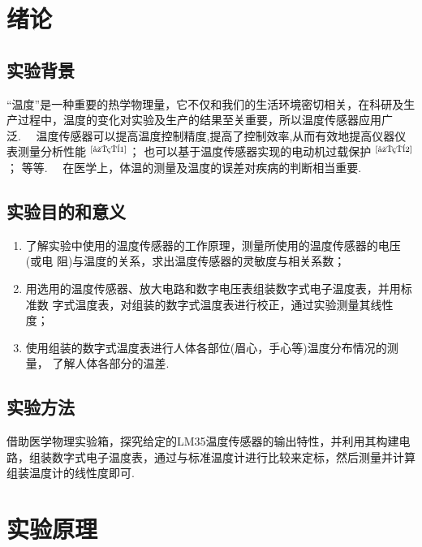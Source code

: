 \documentclass[a4paper,12pt]{article}%
\begin{document}
\section{绪论}%
\subsection{实验背景}
\begin{spacing}{1.528}%
“温度”是一种重要的热学物理量，它不仅和我们的生活环境密切相关，在科研及生产过程中，温度的变化对实验及生产的结果至关重要，所以温度传感器应用广泛.~~
温度传感器可以提高温度控制精度,提高了控制效率,从而有效地提高仪器仪表测量分析性能
$^\text{\cite{应用1}}$；
也可以基于温度传感器实现的电动机过载保护
$^\text{\cite{应用2}}$；
等等.~~
在医学上，体温的测量及温度的误差对疾病的判断相当重要.~~
\end{spacing}

\subsection{实验目的和意义}
\begin{spacing}{1.528}%
    \begin{enumerate}
        \item 了解实验中使用的温度传感器的工作原理，测量所使用的温度传感器的电压(或电 阻)与温度的关系，求出温度传感器的灵敏度与相关系数；
        \item 用选用的温度传感器、放大电路和数字电压表组装数字式电子温度表，并用标准数 字式温度表，对组装的数字式温度表进行校正，通过实验测量其线性度；
        \item 使用组装的数字式温度表进行人体各部位(眉心，手心等)温度分布情况的测量， 了解人体各部分的温差.~~
    \end{enumerate}
\end{spacing}

\subsection{实验方法}
\begin{spacing}{1.528}%
借助医学物理实验箱，探究给定的LM35温度传感器的输出特性，并利用其构建电路，组装数字式电子温度表，通过与标准温度计进行比较来定标，然后测量并计算组装温度计的线性度即可.~~
\end{spacing}

\section{实验原理}
\end{document}
